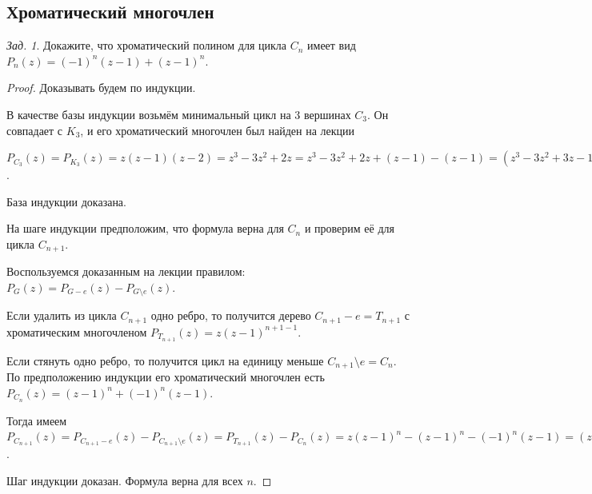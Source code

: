 \documentclass[a4paper,12pt]{article}
\numberwithin{figure}{section}
\theoremstyle{remark}
\newtheorem{problem}{Зад.}[section]
\begin{document}
\subsection{Хроматический многочлен}

\begin{problem}
	Докажите, что хроматический полином для цикла $C_n$ имеет вид
	$P_n(z) = (-1)^n(z-1)+(z-1)^n$.
\end{problem}
\begin{proof}
	Доказывать будем по индукции.
	
	В качестве базы индукции возьмём минимальный цикл на 3 вершинах $C_3$. Он совпадает с $K_3$, и его хроматический многочлен был найден на лекции
	
	$P_{C_3}(z) = P_{K_3}(z) = z(z-1)(z-2) = z^3-3z^2+2z = z^3-3z^2+2z+(z-1)-(z-1)
	 = (z^3-3z^2+3z-1)+(-1)(z-1) = (z-1)^3+(-1)^3(z-1)$.
	
	База индукции доказана.
	
	На шаге индукции предположим, что формула верна для $C_n$ и проверим её для цикла $C_{n+1}$.
	
	Воспользуемся доказанным на лекции правилом:
	$P_{G}(z) = P_{G-e}(z) - P_{G\setminus e}(z)$.
	
	Если удалить из цикла $C_{n+1}$ одно ребро,
	то получится дерево $C_{n+1}-e=T_{n+1}$ с хроматическим многочленом
	$P_{T_{n+1}}(z)=z(z-1)^{n+1-1}$.
	
	Если стянуть одно ребро, то получится цикл на единицу меньше $C_{n+1}\setminus e=C_n$.
	По предположению индукции его хроматический многочлен есть
	$P_{C_{n}}(z) = (z-1)^n + (-1)^n(z-1)$.
	
	Тогда имеем
	$P_{C_{n+1}}(z) = P_{C_{n+1}-e}(z) - P_{C_{n+1}\setminus e}(z)
	 = P_{T_{n+1}}(z) - P_{C_{n}}(z) = z(z-1)^n - (z-1)^n - (-1)^n(z-1)
	 = (z-1)(z-1)^n + (-1)(-1)^n(z-1) = (z-1)^{n+1} + (-1)^{n+1}(z-1)$.
	
	Шаг индукции доказан. Формула верна для всех $n$.
\end{proof}
\end{document}
